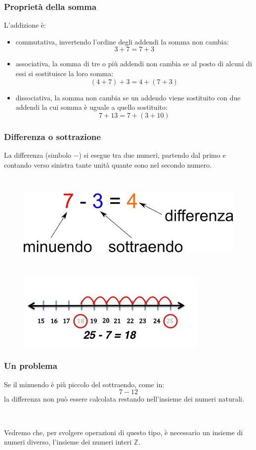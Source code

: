 \documentclass[handout]{beamer}
\theoremstyle{plain}
\begin{document}
\begin{frame}
\frametitle{Proprietà della somma}
L'addizione è:
\begin{itemize}
  \item \alert{commutativa}, invertendo l'ordine degli addendi la somma non cambia:\[3+7=7+3\]\pause
  \item \alert{associativa}, la somma di tre o più addendi non cambia se al posto di alcuni di essi si sostituisce la loro somma:\[(4+7)+3=4+(7+3)\]\pause
  \item \alert{dissociativa}, la somma non cambia se un addendo viene sostituito con due addendi la cui somma è uguale a quello sostituito:\[7+ 13 = 7+ (3+10)\]
\end{itemize}
\end{frame}

\begin{frame}
\frametitle{Differenza o sottrazione}
La differenza (simbolo $ - $) si esegue tra due numeri, partendo dal primo e contando verso sinistra tante unità quante sono nel secondo numero.

~

\begin{figure}
  \includegraphics[width=.4\columnwidth]{img/differenza2.png}

  ~

  \includegraphics[width=.6\columnwidth]{img/differenza.png}
\end{figure}
\end{frame}

\begin{frame}
\frametitle{Un problema}
Se il minuendo è più piccolo del sottraendo, come in:\[7-12\]la differenza non può essere calcolata restando nell'insieme dei numeri naturali.

~

Vedremo che, per svolgere operazioni di questo tipo, è necessario un insieme di numeri diverso, l'insieme dei numeri interi $ \mathbb{Z} $.
\end{frame}
\end{document}
